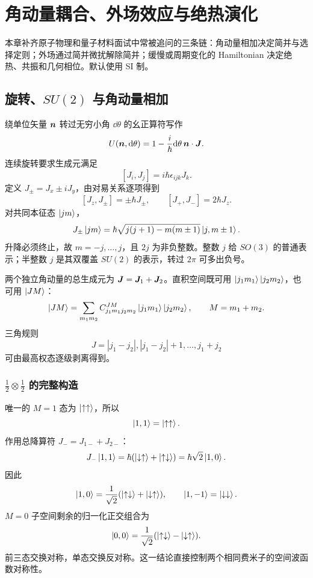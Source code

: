 \chapter{角动量耦合、外场效应与绝热演化}

\begin{mapbox}
本章补齐原子物理和量子材料面试中常被追问的三条链：角动量相加决定简并与选择定则；外场通过简并微扰解除简并；缓慢或周期变化的 Hamiltonian 决定绝热、共振和几何相位。默认使用 SI 制。
\end{mapbox}

\section{旋转、$SU(2)$ 与角动量相加}
绕单位矢量 $\bm{n}$ 转过无穷小角 $\dd\theta$ 的幺正算符写作
\[
U(\bm{n},\mathrm d\theta)=1-\frac{i}{\hbar}\mathrm d\theta\,\bm{n}\cdot\bm{J}.
\]
连续旋转要求生成元满足
\[
[J_i,J_j]=i\hbar\epsilon_{ijk}J_k.
\]
定义 $J_\pm=J_x\pm iJ_y$，由对易关系逐项得到
\[
[J_z,J_\pm]=\pm\hbar J_\pm,\qquad
[J_+,J_-]=2\hbar J_z.
\]
对共同本征态 $\left|jm\right\rangle$，
\[
J_\pm\left|jm\right\rangle
=\hbar\sqrt{j(j+1)-m(m\pm1)}\left|j,m\pm1\right\rangle.
\]
升降必须终止，故 $m=-j,\ldots,j$，且 $2j$ 为非负整数。整数 $j$ 给 $SO(3)$ 的普通表示；半整数 $j$ 是其双覆盖 $SU(2)$ 的表示，转过 $2\pi$ 可多出负号。

两个独立角动量的总生成元为 $\bm{J}=\bm{J}_1+\bm{J}_2$。直积空间既可用
$\left|j_1m_1\right\rangle\left|j_2m_2\right\rangle$，也可用 $\left|JM\right\rangle$：
\[
\left|JM\right\rangle=\sum_{m_1m_2}
C^{JM}_{j_1m_1j_2m_2}\left|j_1m_1\right\rangle\left|j_2m_2\right\rangle,
\qquad M=m_1+m_2.
\]
三角规则
\[
J=|j_1-j_2|,|j_1-j_2|+1,\ldots,j_1+j_2
\]
可由最高权态逐级剥离得到。

\subsection{$\tfrac12\otimes\tfrac12$ 的完整构造}
唯一的 $M=1$ 态为 $\left|\uparrow\uparrow\right\rangle$，所以
\[
\left|1,1\right\rangle=\left|\uparrow\uparrow\right\rangle.
\]
作用总降算符 $J_-=J_{1-}+J_{2-}$：
\[
J_-\left|1,1\right\rangle
=\hbar(\left|\downarrow\uparrow\right\rangle+\left|\uparrow\downarrow\right\rangle)
=\hbar\sqrt2\left|1,0\right\rangle.
\]
因此
\[
\left|1,0\right\rangle=\frac1{\sqrt2}
(\left|\uparrow\downarrow\right\rangle+\left|\downarrow\uparrow\right\rangle),\qquad
\left|1,-1\right\rangle=\left|\downarrow\downarrow\right\rangle.
\]
$M=0$ 子空间剩余的归一化正交组合为
\[
\left|0,0\right\rangle=\frac1{\sqrt2}
(\left|\uparrow\downarrow\right\rangle-\left|\downarrow\uparrow\right\rangle).
\]
前三态交换对称，单态交换反对称。这一结论直接控制两个相同费米子的空间波函数对称性。

